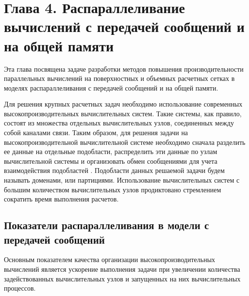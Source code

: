 \newpage
\section*{Глава 4. Распараллеливание вычислений с \mbox{передачей} сообщений и на общей памяти} %
\addtocounter{section}{1}                                                    %
\setcounter{subsection}{0}
\setcounter{figure}{0}
\setcounter{equation}{0}
\setcounter{table}{0}
\setcounter{theorem}{0}
\setcounter{lemma}{0}
\setcounter{definition}{0}

Эта глава посвящена задаче разработки методов повышения производительности параллельных вычислений на поверхностных и объемных расчетных сетках в моделях распараллеливания с передачей сообщений и на общей памяти.

Для решения крупных расчетных задач необходимо использование современных высокопроизводительных вычислительных систем.
Такие системы, как правило, состоят из множества отдельных вычислительных узлов, соединенных между собой каналами связи.
Таким образом, для решения задачи на высокопроизводительной вычислительной системе необходимо сначала разделить ее данные на отдельные подобласти, распределить эти данные по узлам вычислительной системы и организовать обмен сообщениями для учета взаимодействия подобластей \cite{GOST57700HPC}.
Подобласти данных решаемой задачи будем называть доменами, или партициями.
Использование вычислительных систем с большим количеством вычислительных узлов продиктовано стремлением сократить время выполнения расчетов.


\subsection{Показатели распараллеливания в модели с \mbox{передачей} сообщений}

Основным показателем качества организации высокопроизводительных вычислений является ускорение выполнения задачи при увеличении количества задействованных вычислительных узлов и запущенных на них вычислительных процессов.

